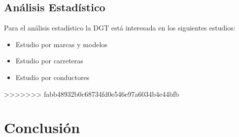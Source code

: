 \documentclass[]{article}
\begin{document}
\subsection{Análisis Estadístico}
\label{subsec:analisis_estadistico}

Para el análisis estadístico la DGT está interesada en los siguientes estudios:
\begin{itemize}
    \item Estudio por marcas y modelos
    \item Estudio por carreteras
    \item Estudio por conductores
\end{itemize}
>>>>>>> fabb48932b0c68734fd0e546e97a6034b4e44bfb

\newpage
\section{Conclusión}
\label{sec:conclusion}
\end{document}
